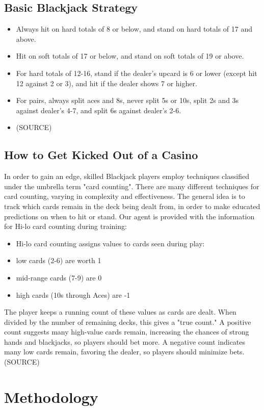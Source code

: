 \documentclass[10pt]{article}
\theoremstyle{definition}
\begin{document}
\subsection{Basic Blackjack Strategy}
\begin{itemize}
    \item Always hit on hard totals of 8 or below, and stand on hard totals of 17 and above.
    \item Hit on soft totals of 17 or below, and stand on soft totals of 19 or above. 
    \item For hard totals of 12-16, stand if the dealer's upcard is 6 or lower (except hit 12 against 2 or 3), and hit if the dealer shows 7 or higher.
    \item For pairs, always split aces and 8s, never split 5s or 10s, split 2s and 3s against dealer's 4-7, and split 6s against dealer's 2-6.
    \item (SOURCE)
\end{itemize}
\subsection{How to Get Kicked Out of a Casino}
In order to gain an edge, skilled Blackjack players employ techniques classified under the umbrella term "card counting".
There are many different techniques for card counting, varying in complexity and effectiveness.
The general idea is to track which cards remain in the deck being dealt from, in order to make educated predictions on when to hit or stand.
Our agent is provided with the information for Hi-lo card counting during training:
\begin{itemize}
    \item Hi-lo card counting assigns values to cards seen during play: 
    \item low cards (2-6) are worth 1
    \item mid-range cards (7-9) are 0
    \item high cards (10s through Aces) are -1
\end{itemize}
The player keeps a running count of these values as cards are dealt. When divided by the number of remaining decks, 
this gives a "true count." A positive count suggests many high-value cards remain, increasing the chances of strong hands and blackjacks, 
so players should bet more. A negative count indicates many low cards remain, favoring the dealer, so players should minimize bets. (SOURCE)

\section{Methodology}
\end{document}
